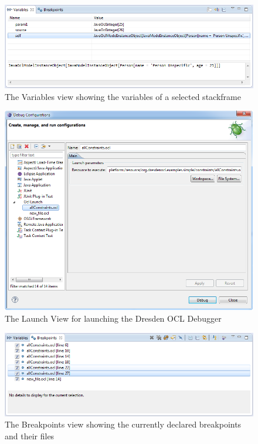\begin{figure}[tbp]
	\centering
	\includegraphics[width=\textwidth,height=\textheight,keepaspectratio]{figures/interpreter/debug02}
  \caption{The Variables view showing the variables of a selected stackframe}
  \label{pic:interpret:debug02}
\end{figure}

\begin{figure}[tbp]
	\centering
	\includegraphics[width=\textwidth,height=\textheight,keepaspectratio]{figures/interpreter/debug03}
  \caption{The Launch View for launching the Dresden OCL Debugger} 
  \label{pic:interpret:debug03}
\end{figure}

\begin{figure}[tbp]
	\centering
	\includegraphics[width=\textwidth,height=\textheight,keepaspectratio]{figures/interpreter/debug04}
  \caption{The Breakpoints view showing the currently declared breakpoints and their files}
  \label{pic:interpret:debug04} 
\end{figure}

